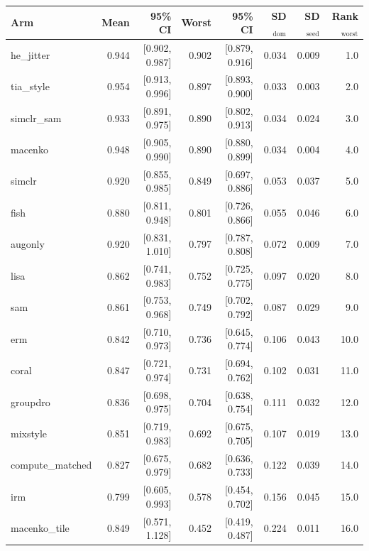 \begin{tabular}{lrrrrrrr}
\toprule
Arm & Mean & 95\% CI & Worst & 95\% CI & SD$_\text{dom}$ & SD$_\text{seed}$ & Rank$_\text{worst}$ \\
\midrule
he\_jitter & 0.944 & [0.902, 0.987] & 0.902 & [0.879, 0.916] & 0.034 & 0.009 & 1.0 \\
tia\_style & 0.954 & [0.913, 0.996] & 0.897 & [0.893, 0.900] & 0.033 & 0.003 & 2.0 \\
simclr\_sam & 0.933 & [0.891, 0.975] & 0.890 & [0.802, 0.913] & 0.034 & 0.024 & 3.0 \\
macenko & 0.948 & [0.905, 0.990] & 0.890 & [0.880, 0.899] & 0.034 & 0.004 & 4.0 \\
simclr & 0.920 & [0.855, 0.985] & 0.849 & [0.697, 0.886] & 0.053 & 0.037 & 5.0 \\
fish & 0.880 & [0.811, 0.948] & 0.801 & [0.726, 0.866] & 0.055 & 0.046 & 6.0 \\
augonly & 0.920 & [0.831, 1.010] & 0.797 & [0.787, 0.808] & 0.072 & 0.009 & 7.0 \\
lisa & 0.862 & [0.741, 0.983] & 0.752 & [0.725, 0.775] & 0.097 & 0.020 & 8.0 \\
sam & 0.861 & [0.753, 0.968] & 0.749 & [0.702, 0.792] & 0.087 & 0.029 & 9.0 \\
erm & 0.842 & [0.710, 0.973] & 0.736 & [0.645, 0.774] & 0.106 & 0.043 & 10.0 \\
coral & 0.847 & [0.721, 0.974] & 0.731 & [0.694, 0.762] & 0.102 & 0.031 & 11.0 \\
groupdro & 0.836 & [0.698, 0.975] & 0.704 & [0.638, 0.754] & 0.111 & 0.032 & 12.0 \\
mixstyle & 0.851 & [0.719, 0.983] & 0.692 & [0.675, 0.705] & 0.107 & 0.019 & 13.0 \\
compute\_matched & 0.827 & [0.675, 0.979] & 0.682 & [0.636, 0.733] & 0.122 & 0.039 & 14.0 \\
irm & 0.799 & [0.605, 0.993] & 0.578 & [0.454, 0.702] & 0.156 & 0.045 & 15.0 \\
macenko\_tile & 0.849 & [0.571, 1.128] & 0.452 & [0.419, 0.487] & 0.224 & 0.011 & 16.0 \\
\bottomrule
\end{tabular}
